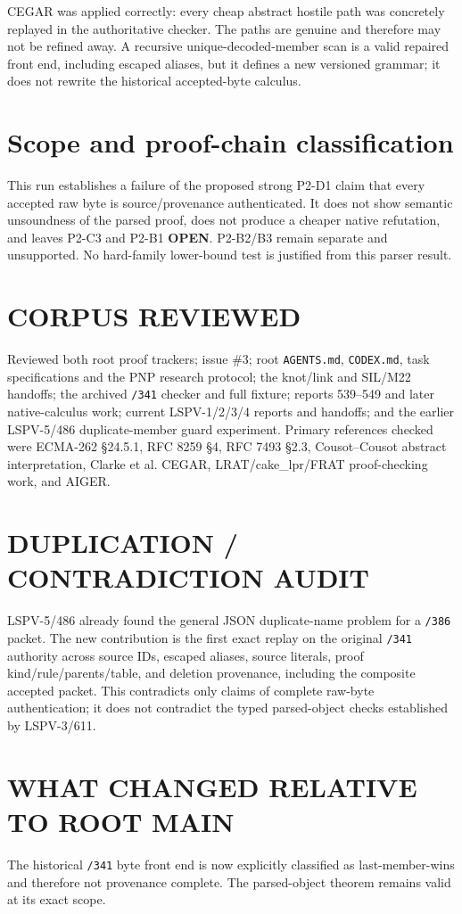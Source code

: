 \documentclass[11pt]{article}
\begin{document}
CEGAR was applied correctly: every cheap abstract hostile path was concretely replayed in the
authoritative checker.  The paths are genuine and therefore may not be refined away.  A recursive
unique-decoded-member scan is a valid repaired front end, including escaped aliases, but it defines
a new versioned grammar; it does not rewrite the historical accepted-byte calculus.

\section{Scope and proof-chain classification}
This run establishes a failure of the proposed strong P2-D1 claim that every accepted raw byte is
source/provenance authenticated.  It does not show semantic unsoundness of the parsed proof, does
not produce a cheaper native refutation, and leaves P2-C3 and P2-B1 \textbf{OPEN}.  P2-B2/B3 remain
separate and unsupported.  No hard-family lower-bound test is justified from this parser result.

\section{CORPUS REVIEWED}
Reviewed both root proof trackers; issue \#3; root \texttt{AGENTS.md}, \texttt{CODEX.md}, task
specifications and the PNP research protocol; the knot/link and SIL/M22 handoffs; the archived
\texttt{/341} checker and full fixture; reports 539--549 and later native-calculus work; current
LSPV-1/2/3/4 reports and handoffs; and the earlier LSPV-5/486 duplicate-member guard experiment.
Primary references checked were ECMA-262 \S24.5.1, RFC 8259 \S4, RFC 7493 \S2.3, Cousot--Cousot
abstract interpretation, Clarke et al. CEGAR, LRAT/cake\_lpr/FRAT proof-checking work, and AIGER.

\section{DUPLICATION / CONTRADICTION AUDIT}
LSPV-5/486 already found the general JSON duplicate-name problem for a \texttt{/386} packet.  The
new contribution is the first exact replay on the original \texttt{/341} authority across source
IDs, escaped aliases, source literals, proof kind/rule/parents/table, and deletion provenance,
including the composite accepted packet.  This contradicts only claims of complete raw-byte
authentication; it does not contradict the typed parsed-object checks established by LSPV-3/611.

\section{WHAT CHANGED RELATIVE TO ROOT MAIN}
The historical \texttt{/341} byte front end is now explicitly classified as last-member-wins and
therefore not provenance complete.  The parsed-object theorem remains valid at its exact scope.
\end{document}
